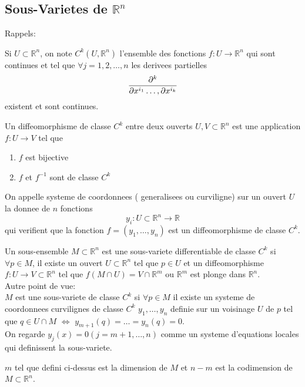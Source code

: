 \documentclass[../main.tex]{subfiles}
\begin{document}
\subsection{Sous-Varietes de $ \mathbb{R}^n$ }
Rappels:
\begin{defn}
	Si $U \subset \mathbb{R}^n$, on note $C^{k}( U, \mathbb{R}^n) $ l'ensemble des fonctions $f: U \to \mathbb{R}^n$ qui sont continues et tel que $\forall j = 1,2,\ldots, n$ les derivees partielles
	\[ 
	\frac{\partial^{k}}{\partial x^{i_1}\ldots, \partial x^{i_k}}
	\]
	existent et sont continues.
\end{defn}
\begin{defn}
Un diffeomorphisme de classe $C^{k}$ entre deux ouverts $U,V \subset \mathbb{R}^n$ est une application $f:U\to V$ tel que
\begin{enumerate}
\item $f$ est bijective
\item $f$ et $f^{-1}$ sont de classe $C^{k}$ 
\end{enumerate}
\end{defn}
\begin{defn}
	On appelle systeme de coordonnees ( generalisees ou curviligne) sur un ouvert $U$ la donnee de $n$ fonctions
	\[ 
	y_i : U \subset \mathbb{R}^n\to \mathbb{R}
	\]
	qui verifient que la fonction $f= ( y_1,\ldots, y_n) $ est un diffeomorphisme de classe $C^{k}$.	
	
\end{defn}
\begin{defn}
	Un sous-ensemble $M \subset \mathbb{R}^n$ est une sous-variete differentiable de classe $C^{k}$ si $\forall p \in M$, il existe un ouvert $U \subset \mathbb{R}^n$ tel que $p\in U$ et un diffeomorphisme
	$f:U\to V \subset \mathbb{R}^n$ tel que $f( M\cap U) = V\cap \mathbb{R}^{m}$ ou $ \mathbb{R}^m$ est plonge dans $ \mathbb{R}^n$.\\
	Autre point de vue:\\
	$M$ est une sous-variete de classe $C^{k}$ si $\forall p \in M$ il existe un systeme de coordonnees curvilignes de classe $C^{k}$ $y_1,\ldots, y_n$ definie sur un voisinage $U$ de $p$ tel que $q\in U\cap M$ $\iff$ $ y_{m+1} ( q) = \ldots = y_n( q) =0$.\\
	On regarde $y_j( x) =0 ( j= m+1,\ldots, n) $ comme un systeme d'equations locales qui definissent la sous-variete.
	
\end{defn}
\begin{defn}
	$m$ tel que defini ci-dessus est la dimension de $M$ et $n-m$ est la codimension de $ M \subset \mathbb{R}^n$.
\end{defn}
\end{document}
